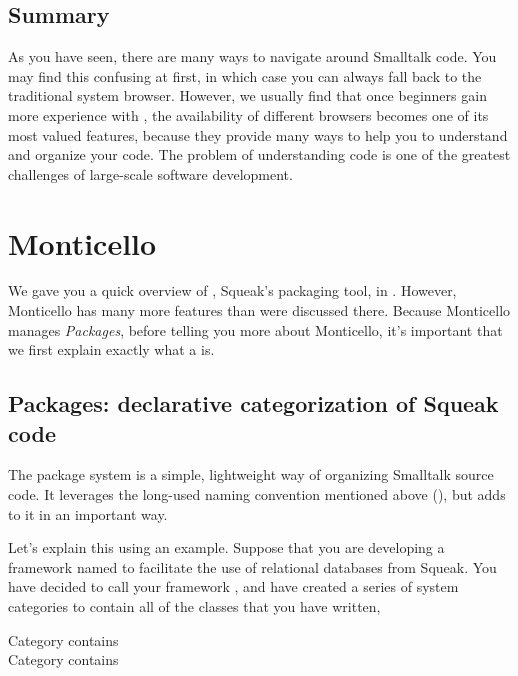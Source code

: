 \documentclass[a4paper,10pt,twoside]{book}
\begin{document}
\subsection{Summary}

As you have seen, there are many ways to navigate around Smalltalk code. 
You may find this confusing at first, in which case you can always fall back to the traditional system browser.
However, we usually find that once beginners gain more experience with \sq, the availability of different browsers becomes one of its most valued features, because they provide many ways to help you to understand and organize your code.
The problem of understanding code is one of the greatest challenges of large-scale software development. 

\section{Monticello}

We gave you a quick overview of , Squeak's packaging tool, in .  
However, Monticello has many more features than were discussed there.  
Because Monticello manages \emph{Packages}, before telling you more about Monticello, it's important that we first explain exactly what a  is.

\subsection{Packages: declarative categorization of Squeak code}

The package system is a simple, lightweight way of organizing Smalltalk source code.
It leverages the long-used naming convention mentioned above (), but adds to it in an important way.

Let's explain this using an example.
Suppose that you are developing a framework named to facilitate the use of relational databases from Squeak. You have decided to call your framework , and have created a series of system categories to contain all of the classes that you have written, \eg

\vspace{1ex}
\noindent
Category  contains \\
Category  contains 
\end{document}
